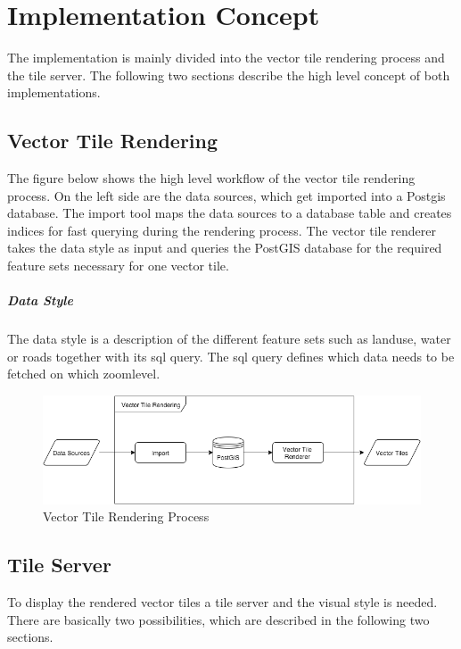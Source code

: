 \chapter{Implementation Concept}\label{implementation_concept}

The implementation is mainly divided into the vector tile rendering process and the tile server. The following two sections describe the high level concept of both implementations.

\section{Vector Tile Rendering}

The figure below shows the high level workflow of the vector tile rendering process. On the left side are the data sources, which get imported into a Postgis database. The import tool maps the data sources to a database table and creates indices for fast querying during the rendering process.
The vector tile renderer takes the data style as input and queries the PostGIS database for the required feature sets necessary for one vector tile.

\paragraph{Data Style} The data style is a description of the different feature sets such as landuse, water or roads together with its sql query. The sql query defines which data needs to be fetched on which zoomlevel.

\begin{figure}[h]
  \centering
  \includegraphics[width=1\textwidth]{images/vector_tile_rendering.png}
  \caption{Vector Tile Rendering Process}
\end{figure}

\section{Tile Server}

To display the rendered vector tiles a tile server and the visual style is needed. There are basically two possibilities, which are described in the following two sections.

